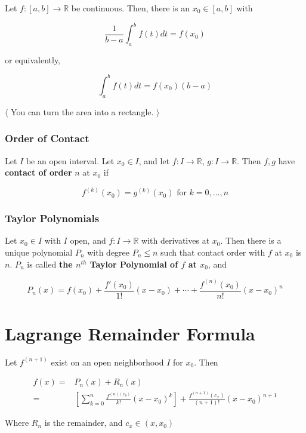\documentclass[12pt,letterpaper]{article}
\newcommand{\R}{{\mathbb R}}
\newcommand{\btw}[1]{
    $\langle$ #1 $\rangle$
}
\begin{document}
\begin{multicols*}{2}
        Let $f: [a, b] \rightarrow \R$ be continuous. Then, there is an $x_0 \in
        [a, b]$ with

        \[
          \frac{1}{b - a} \int_a^b f(t) dt = f(x_0)
        \]

        or equivalently,

        \[
          \int_a^b f(t) dt = f(x_0)(b - a)
        \]

        \btw { You can turn the area into a rectangle. }

        \subsubsection{Order of Contact}

        Let $I$ be an open interval. Let $x_0 \in I$, and let $f: I \to \R$, $g:
        I \to \R$. Then $f, g$ have {\bf contact of order} $n$ at $x_0$ if

        \[
          f^{(k)}(x_0) = g^{(k)}(x_0) \text{ for } k = 0, ..., n
        \]

        \subsubsection{Taylor Polynomials}

        Let $x_0 \in I$ with $I$ open, and $f: I \to \R$ with derivatives at
        $x_0$. Then there is a unique polynomial $P_n$ with degree $P_n \le n$
        such that contact order with $f$ at $x_0$ is $n$. $P_n$ is called {\bf
        the $n^{th}$ Taylor Polynomial of $f$ at $x_0$}, and 

        \[
          P_n(x) = f(x_0) + \frac{f'(x_0)}{1!}(x - x_0) + \cdots + \frac{f^{(n)}(x_0)}{n!}(x - x_0)^n
        \]

        \section{Lagrange Remainder Formula}

        Let $f^{(n + 1)}$ exist on an open neighborhood $I$ for $x_0$. Then

        \begin{align*}
          f(x) =&P_n(x) + R_n(x) \\
               =&\left[ \sum_{k = 0}^n \frac{f^{(n)(x_0)}}{k!}(x - x_0)^k \right] + \frac{f^{(n + 1)}(c_x)}{(n + 1)!}(x - x_0)^{n + 1}
        \end{align*}

        Where $R_n$ is the remainder, and $c_x \in (x, x_0)$


\end{multicols*}
\end{document}
